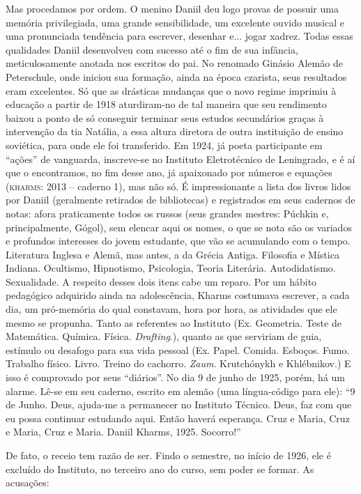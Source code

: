 Mas procedamos por ordem. O menino Daniil deu logo provas de possuir uma
memória privilegiada, uma grande sensibilidade, um excelente ouvido
musical e uma pronunciada tendência para escrever, desenhar e... jogar
xadrez. Todas essas qualidades Daniil desenvolveu com sucesso até o fim
de sua infância, meticulosamente anotada nos escritos do pai. No
renomado Ginásio Alemão de Peterschule, onde iniciou sua formação, ainda
na época czarista, seus resultados eram excelentes. Só que as drásticas
mudanças que o novo regime imprimiu à educação a partir de 1918
aturdiram-no de tal maneira que seu rendimento baixou a ponto de só
conseguir terminar seus estudos secundários graças à intervenção da tia
Natália, a essa altura diretora de outra instituição de ensino
soviética, para onde ele foi transferido. Em 1924, já poeta participante
em ``ações'' de vanguarda, inscreve-se no Instituto Eletrotécnico de
Leningrado, e é aí que o encontramos, no fim desse ano, já apaixonado
por números e equações (\textsc{kharms}: 2013 -- caderno 1), mas não só.
É impressionante a lista dos livros lidos por Daniil (geralmente
retirados de bibliotecas) e registrados em seus cadernos de notas: afora
praticamente todos os russos (seus grandes mestres: Púchkin e,
principalmente, Gógol), sem elencar aqui os nomes, o que se nota são os
variados e profundos interesses do jovem estudante, que vão se
acumulando com o tempo. Literatura Inglesa e Alemã, mas antes, a da
Grécia Antiga. Filosofia e Mística Indiana. Ocultismo, Hipnotismo,
Psicologia, Teoria Literária. Autodidatismo. Sexualidade. A respeito
desses dois itens cabe um reparo. Por um hábito pedagógico adquirido
ainda na adolescência, Kharms costumava escrever, a cada dia, um
pró-memória do qual constavam, hora por hora, as atividades que ele
mesmo se propunha. Tanto as referentes ao Instituto (Ex. Geometria.
Teste de Matemática. Química. Física. \emph{Drafting}.), quanto as que
serviriam de guia, estímulo ou desafogo para sua vida pessoal (Ex.
Papel. Comida. Esboços. Fumo. Trabalho físico. Livro. Treino do
cachorro. \emph{Zaum}. Krutchónykh e Khlébnikov.) E isso é comprovado
por seus ``diários''. No dia 9 de junho de 1925, porém, há um alarme.
Lê-se em seu caderno, escrito em alemão (uma língua-código para ele):
``9 de Junho. Deus, ajuda-me a permanecer no Instituto Técnico. Deus,
faz com que eu possa continuar estudando aqui. Então haverá esperança.
Cruz e Maria, Cruz e Maria, Cruz e Maria. Daniil Kharms, 1925.
Socorro!''

De fato, o receio tem razão de ser. Findo o semestre, no início de 1926,
ele é excluído do Instituto, no terceiro ano do curso, sem poder se
formar. As acusações:

